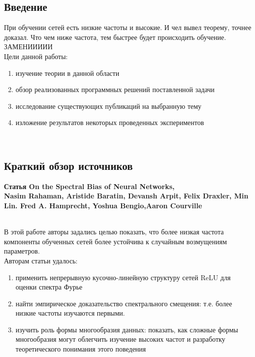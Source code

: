 \documentclass{article}
\begin{document}
    \newpage
    \begin{center} 
    \section{Введение}
    \end{center}
    \large 
    При обучении сетей есть низкие частоты и высокие. И чел вывел теорему, точнее доказал. Что чем ниже частота, тем быстрее будет происходить обучение. \\ ЗАМЕНИИИИИ\\
    Цели данной работы:\\
    \begin{enumerate} 
    \item изучение теории в данной области
    \item обзор реализованных программных решений поставленной задачи
    \item исследование существующих публикаций на выбранную тему
    \item изложение результатов некоторых проведенных экспериментов
    \end{enumerate} 
    \\
    
    \newpage
    \begin{center} 
    \section{Краткий обзор источников}
    \large \textbf {Статья On the Spectral Bias of Neural Networks, \\ Nasim Rahaman, Aristide Baratin, Devansh Arpit, Felix Draxler, Min Lin. Fred A. Hamprecht, Yoshua Bengio,Aaron Courville}    
    \end{center}
    \\
    \large 
    В этой работе авторы задались целью показать, что более низкая частота компоненты обученных сетей более устойчива к случайным возмущениям параметров. 
    \\
    Авторам статьи удалось:
    \begin{enumerate}
    \item применить непрерывную кусочно-линейную структуру сетей ReLU для оценки спектра Фурье
    \item найти эмпирическое доказательство спектрального смещения: т.е. более низкие частоты изучаются первыми. 
    \item изучить роль формы многообразия данных: показать, как сложные формы многообразия могут облегчить изучение высоких частот и разработку теоретического понимания этого поведения
    \end{enumerate}
    \\ \\
    
\end{document}
